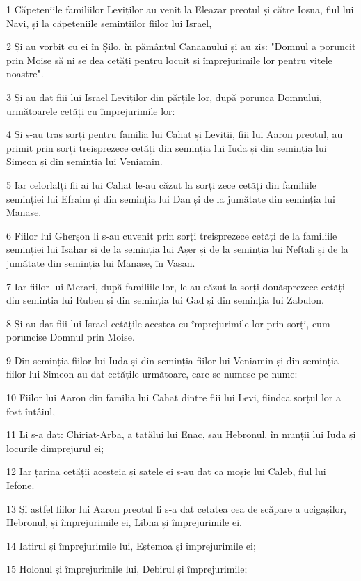 \par 1 Căpeteniile familiilor Leviților au venit la Eleazar preotul și către Iosua, fiul lui Navi, și la căpeteniile semințiilor fiilor lui Israel,
\par 2 Și au vorbit cu ei în Șilo, în pământul Canaanului și au zis: "Domnul a poruncit prin Moise să ni se dea cetăți pentru locuit și împrejurimile lor pentru vitele noastre".
\par 3 Și au dat fiii lui Israel Leviților din părțile lor, după porunca Domnului, următoarele cetăți cu împrejurimile lor:
\par 4 Și s-au tras sorți pentru familia lui Cahat și Leviții, fiii lui Aaron preotul, au primit prin sorți treisprezece cetăți din seminția lui Iuda și din seminția lui Simeon și din seminția lui Veniamin.
\par 5 Iar celorlalți fii ai lui Cahat le-au căzut la sorți zece cetăți din familiile seminției lui Efraim și din seminția lui Dan și de la jumătate din seminția lui Manase.
\par 6 Fiilor lui Gherșon li s-au cuvenit prin sorți treisprezece cetăți de la familiile seminției lui Isahar și de la seminția lui Așer și de la seminția lui Neftali și de la jumătate din seminția lui Manase, în Vasan.
\par 7 Iar fiilor lui Merari, după familiile lor, le-au căzut la sorți douăsprezece cetăți din seminția lui Ruben și din seminția lui Gad și din seminția lui Zabulon.
\par 8 Și au dat fiii lui Israel cetățile acestea cu împrejurimile lor prin sorți, cum poruncise Domnul prin Moise.
\par 9 Din seminția fiilor lui Iuda și din seminția fiilor lui Veniamin și din seminția fiilor lui Simeon au dat cetățile următoare, care se numesc pe nume:
\par 10 Fiilor lui Aaron din familia lui Cahat dintre fiii lui Levi, fiindcă sorțul lor a fost întâiul,
\par 11 Li s-a dat: Chiriat-Arba, a tatălui lui Enac, sau Hebronul, în munții lui Iuda și locurile dimprejurul ei;
\par 12 Iar țarina cetății acesteia și satele ei s-au dat ca moșie lui Caleb, fiul lui Iefone.
\par 13 Și astfel fiilor lui Aaron preotul li s-a dat cetatea cea de scăpare a ucigașilor, Hebronul, și împrejurimile ei, Libna și împrejurimile ei.
\par 14 Iatirul și împrejurimile lui, Eștemoa și împrejurimile ei;
\par 15 Holonul și împrejurimile lui, Debirul și împrejurimile;

